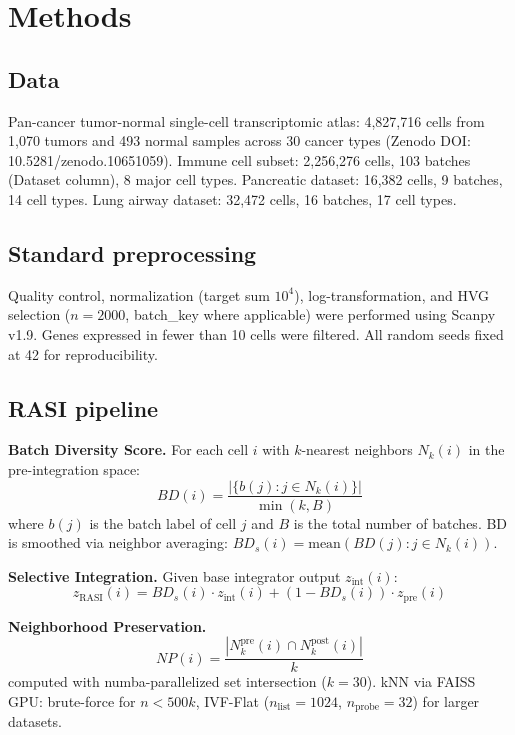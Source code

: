\documentclass[10pt]{article}
\begin{document}
\section*{Methods}

\subsection*{Data}
Pan-cancer tumor-normal single-cell transcriptomic atlas\cite{kang2024}: 4,827,716 cells from 1,070 tumors and 493 normal samples across 30 cancer types (Zenodo DOI: 10.5281/zenodo.10651059). Immune cell subset: 2,256,276 cells, 103 batches (Dataset column), 8 major cell types. Pancreatic dataset\cite{segerstolpe2016}: 16,382 cells, 9 batches, 14 cell types. Lung airway dataset\cite{montoro2018}: 32,472 cells, 16 batches, 17 cell types.

\subsection*{Standard preprocessing}
Quality control, normalization (target sum $10^4$), log-transformation, and HVG selection ($n=2000$, batch\_key where applicable) were performed using Scanpy v1.9\cite{wolf2018}. Genes expressed in fewer than 10 cells were filtered. All random seeds fixed at 42 for reproducibility.

\subsection*{RASI pipeline}

\textbf{Batch Diversity Score.} For each cell $i$ with $k$-nearest neighbors $N_k(i)$ in the pre-integration space:
\begin{equation}
BD(i) = \frac{|\{b(j) : j \in N_k(i)\}|}{\min(k, B)}
\end{equation}
where $b(j)$ is the batch label of cell $j$ and $B$ is the total number of batches. BD is smoothed via neighbor averaging: $BD_s(i) = \text{mean}(BD(j) : j \in N_k(i))$.

\textbf{Selective Integration.} Given base integrator output $z_{\text{int}}(i)$:
\begin{equation}
z_{\text{RASI}}(i) = BD_s(i) \cdot z_{\text{int}}(i) + (1 - BD_s(i)) \cdot z_{\text{pre}}(i)
\end{equation}

\textbf{Neighborhood Preservation.}
\begin{equation}
NP(i) = \frac{|N_k^{\text{pre}}(i) \cap N_k^{\text{post}}(i)|}{k}
\end{equation}
computed with numba-parallelized set intersection ($k=30$). kNN via FAISS GPU\cite{johnson2022}: brute-force for $n < 500k$, IVF-Flat ($n_{\text{list}}=1024$, $n_{\text{probe}}=32$) for larger datasets.
\end{document}
